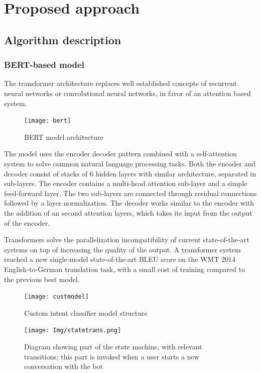 \documentclass[runningheads,a4paper,11pt]{report}
\begin{document}
\chapter{Proposed approach}
\label{chapter:proposedApproach}

\section{Algorithm description}
\label{section:algorithmDescription}

\subsection{BERT-based model}
\label{section:bertModels}

	The transformer architecture \cite{att17} replaces well established concepts of recurrent neural networks or convolutional neural networks, in favor of an attention based system. 

\begin{figure}[h]
\centerline{\texttt{[image: bert]}}  
	\caption{BERT model architecture}
	\label{bertModel}
\end{figure}

	The model uses the encoder decoder pattern combined with a self-attention system to solve common natural language processing tasks.	Both the encoder and decoder consist of stacks of 6 hidden layers with similar architecture, separated in sub-layers. The encoder contains a multi-head attention sub-layer and a simple feed-forward layer. The two sub-layers are connected through residual connections followed by a layer normalization. The decoder works similar to the encoder with the addition of an second attention layers, which takes its input from the output of the encoder. 
	
	Transformers solve the parallelization incompatibility of current state-of-the-art systems on top of increasing the quality of the output. A transformer system reached a new single-model state-of-the-art BLEU score on the WMT 2014 English-to-German translation task, with a small cost of training compared to the previous best model.
	
\begin{figure}
\centerline{\texttt{[image: custmodel]}}  
	\caption{Custom intent classifier model structure}
	\label{custmodel}
\end{figure}


\begin{figure}
\centerline{\texttt{[image: Img/statetrans.png]}}  
	\caption{Diagram showing part of the state machine, with relevant transitions; this part is invoked when a user starts a new conversation with the bot}
	\label{statetrans}
\end{figure}
\end{document}
